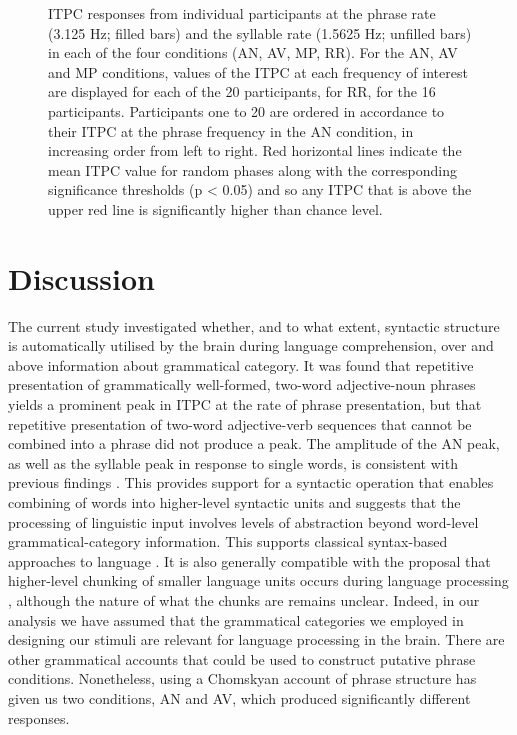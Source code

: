 \documentclass[10pt,letterpaper]{article}
\newcommand{\citet}[1]{\cite{#1}}
\begin{document}
\begin{figure}[tbhp]

\caption{ITPC responses from individual participants at the phrase
  rate (3.125 Hz; filled bars) and the syllable rate (1.5625 Hz;
  unfilled bars) in each of the four conditions (AN, AV, MP, RR). For
  the AN, AV and MP conditions, values of the ITPC at each frequency
  of interest are displayed for each of the 20 participants, for RR,
  for the 16 participants. Participants one to 20 are ordered in
  accordance to their ITPC at the phrase frequency in the AN
  condition, in increasing order from left to right. Red horizontal
  lines indicate the mean ITPC value for random phases along with the
  corresponding significance thresholds (p < 0.05) and so any ITPC
  that is above the upper red line is significantly higher than chance
  level.}
\label{fig:Fig3}
\end{figure}


\section*{Discussion}


The current study investigated whether, and to what extent, syntactic
structure is automatically utilised by the brain during language
comprehension, over and above information about grammatical
category. It was found that repetitive presentation of grammatically
well-formed, two-word adjective-noun phrases yields a prominent peak
in ITPC at the rate of phrase presentation, but that repetitive
presentation of two-word adjective-verb sequences that cannot be
combined into a phrase did not produce a peak. The amplitude of the AN
peak, as well as the syllable peak in response to single words, is
consistent with previous findings \citet{DingEtAl2017}. This provides
support for a syntactic operation that enables combining of words into
higher-level syntactic units and suggests that the processing of
linguistic input involves levels of abstraction beyond word-level
grammatical-category information. This supports classical syntax-based
approaches to language
\citet{BerwickEtAl2013,EveraertEtAl2015,Chomsky1995}. It is also
generally compatible with the proposal that higher-level chunking of
smaller language units occurs during language processing
\citet{ChristiansenChater2016}, although the nature of what the chunks
are remains unclear. Indeed, in our analysis we have assumed that the
grammatical categories we employed in designing our stimuli are
relevant for language processing in the brain. There are other
grammatical accounts that could be used to construct putative phrase
conditions. Nonetheless, using a Chomskyan account of phrase structure
has given us two conditions, AN and AV, which produced significantly
different responses.
\end{document}
